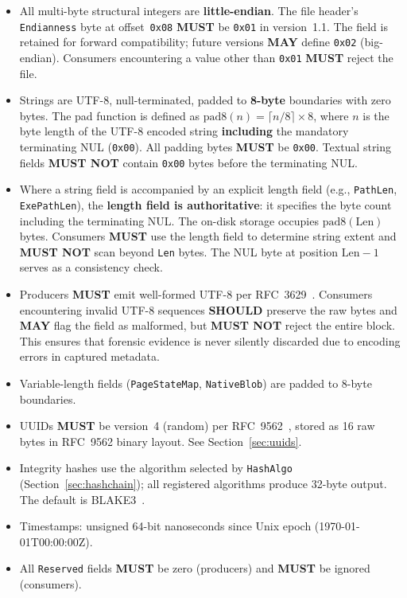 \documentclass[11pt,a4paper]{article}
\newcommand{\MUST}{\textbf{MUST}}
\newcommand{\MUSTNOT}{\textbf{MUST NOT}}
\newcommand{\SHOULD}{\textbf{SHOULD}}
\newcommand{\MAY}{\textbf{MAY}}
\newcommand{\hex}[1]{\texttt{0x#1}}
\newcommand{\field}[1]{\texttt{#1}}
\newcommand{\padeight}{\ensuremath{\mathrm{pad8}}}
\begin{document}
\begin{itemize}[leftmargin=1.5em, itemsep=3pt]
\item All multi-byte structural integers are \textbf{little-endian}. The file header's \field{Endianness} byte at offset~\hex{08} \MUST{} be \hex{01} in version~1.1. The field is retained for forward compatibility; future versions \MAY{} define \hex{02} (big-endian). Consumers encountering a value other than \hex{01} \MUST{} reject the file.
\item Strings are UTF-8, null-terminated, padded to \textbf{8-byte} boundaries with zero bytes. The pad function is defined as $\padeight(n) = \lceil n/8 \rceil \times 8$, where $n$ is the byte length of the UTF-8 encoded string \textbf{including} the mandatory terminating NUL (\hex{00}). All padding bytes \MUST{} be \hex{00}. Textual string fields \MUSTNOT{} contain \hex{00} bytes before the terminating NUL.
\item Where a string field is accompanied by an explicit length field (e.g., \field{PathLen}, \field{ExePathLen}), the \textbf{length field is authoritative}: it specifies the byte count including the terminating NUL. The on-disk storage occupies $\padeight(\text{Len})$ bytes. Consumers \MUST{} use the length field to determine string extent and \MUSTNOT{} scan beyond \field{Len} bytes. The NUL byte at position $\text{Len}-1$ serves as a consistency check.
\item Producers \MUST{} emit well-formed UTF-8 per RFC~3629~\cite{rfc3629}. Consumers encountering invalid UTF-8 sequences \SHOULD{} preserve the raw bytes and \MAY{} flag the field as malformed, but \MUSTNOT{} reject the entire block. This ensures that forensic evidence is never silently discarded due to encoding errors in captured metadata.
\item Variable-length fields (\field{PageStateMap}, \field{NativeBlob}) are padded to 8-byte boundaries.
\item UUIDs \MUST{} be version~4 (random) per RFC~9562~\cite{rfc9562}, stored as 16 raw bytes in RFC~9562 binary layout. See Section~\ref{sec:uuids}.
\item Integrity hashes use the algorithm selected by \field{HashAlgo} (Section~\ref{sec:hashchain}); all registered algorithms produce 32-byte output. The default is BLAKE3~\cite{blake3}.
\item Timestamps: unsigned 64-bit nanoseconds since Unix epoch (1970-01-01T00:00:00Z).
\item All \field{Reserved} fields \MUST{} be zero (producers) and \MUST{} be ignored (consumers).
\end{itemize}
\end{document}
